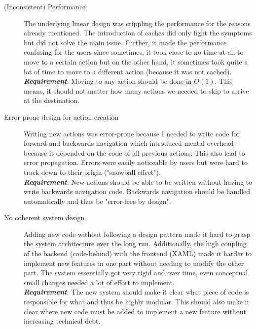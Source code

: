 \begin{description}
\item [(Inconsistent) Performance] The underlying linear design was crippling the performance for the reasons already mentioned. The introduction of caches did only fight the symptoms but did not solve the main issue. Further, it made the performance confusing for the users since sometimes, it took close to no time at all to move to a certain action but on the other hand, it sometimes took quite a lot of time to move to a different action (because it was not cached). \\
\textit{\textbf{Requirement}}: Moving to any action should be done in $O(1)$. This means, it should not matter how many actions we needed to skip to arrive at the destination.
\item [Error-prone design for action creation] Writing new actions was error-prone because I needed to write code for forward and backwards navigation which introduced mental overhead because it depended on the code of all previous actions. This also lead to error propagation. Errors were easily noticeable by users but were hard to track down to their origin ("snowball effect").\\
\textit{\textbf{Requirement}}: New actions should be able to be written without having to write backwards navigation code. Backwards navigation should be handled automatically and thus be "error-free by design".
\item [No coherent system design] Adding new code without following a design pattern made it hard to grasp the system architecture over the long run. Additionally, the high coupling of the backend (code-behind) with the frontend (XAML) made it harder to implement new features in one part without needing to modify the other part. The system essentially got very rigid and over time, even conceptual small changes needed a lot of effort to implement.\\
\textit{\textbf{Requirement}}: The new system should make it clear what piece of code is responsible for what and thus be highly modular. This should also make it clear where new code must be added to implement a new feature without increasing technical debt.
\end{description}
